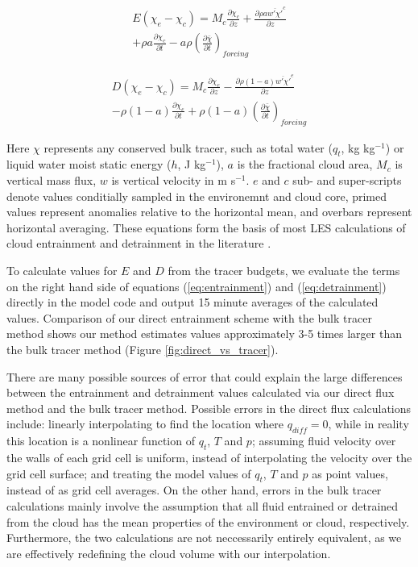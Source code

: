 \documentclass[12pt]{article}
\begin{document}
\begin{equation}
  \label{eq:entrainment}
  \begin{split}
    E (\chi_e - \chi_c) 
    = M_c \frac{\partial \chi_c}{\partial z}
    + \frac{\partial \rho a \overline{w' \chi'}^c}{\partial z} \\
    + \rho a \frac{\partial \chi_c}{\partial t}
    - a \rho \left(\frac{\partial \bar{\chi}}{\partial t}\right)_{forcing}
  \end{split}
\end{equation}

\begin{equation}
  \label{eq:detrainment}
  \begin{split}
    D (\chi_e - \chi_c)
    = M_c \frac{\partial \chi_e}{\partial z}
    - \frac{\partial \rho (1 - a) \overline{w' \chi'}^e}{\partial z} \\
    - \rho (1 - a) \frac{\partial \chi_e}{\partial t}
    + \rho (1 - a) \left(\frac{\partial \bar{\chi}}{\partial t}\right)_{forcing}
  \end{split}
\end{equation}

Here $\chi$ represents any conserved bulk tracer, such as total water ($q_t$, 
kg kg$^{-1}$) or liquid water moist static energy ($h$, J kg$^{-1}$), $a$ is 
the fractional cloud area, $M_c$ is vertical mass flux, $w$ is vertical 
velocity in m s$^{-1}$.  $e$ and $c$ sub- and super-scripts denote values 
conditially sampled in the environemnt and cloud core, primed values represent 
anomalies relative to the horizontal mean, and overbars represent horizontal 
averaging.  These equations form the basis of most LES calculations of 
cloud entrainment and detrainment in the literature 
\citep{Siebesma2003, Rooy2008}.

To calculate values for $E$ and $D$ from the tracer budgets, we evaluate the 
terms on the right hand side of equations (\ref{eq:entrainment}) and 
(\ref{eq:detrainment}) directly in the model code and output 15 minute averages 
of the calculated values.  Comparison of our direct entrainment scheme with 
the bulk tracer method shows our method estimates values approximately 3-5 
times larger than the bulk tracer method (Figure \ref{fig:direct_vs_tracer}).

There are many possible sources of error that could explain the large 
differences between the entrainment and detrainment values calculated 
via our direct flux method and the bulk tracer method.  Possible errors in the 
direct flux calculations include: linearly interpolating to find the location 
where $q_{diff} = 0$, while in reality this location is a nonlinear function 
of $q_t$, $T$ and $p$; assuming fluid velocity over the walls of each grid cell 
is uniform, instead of interpolating the velocity over the grid cell surface; 
and treating the model values of $q_t$, $T$ and $p$ as point values, instead of 
as grid cell averages.  On the other hand, errors in the bulk tracer
calculations mainly involve the assumption that all fluid entrained or
detrained from the cloud has the mean properties of the environment or cloud, 
respectively.  Furthermore, the two calculations are not neccessarily entirely 
equivalent, as we are effectively redefining the cloud volume with our
interpolation.
\end{document}
